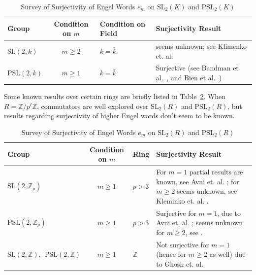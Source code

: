 \documentclass[10pt,twoside]{amsart}
\newcommand{\SL}{\mathrm{SL}}
\theoremstyle{definition}
\theoremstyle{definition}
\begin{document}
\begin{table}[htbp]\caption{Survey of Surjectivity of Engel Words \( e_m \) on $\SL_2(K)$ and $\mathrm{PSL_2}(K)$}
\centering
\label{tab:engel_survey2}
\small 
\begin{tabular}{@{} l c p{3cm} p{7cm} @{}}
\toprule
\textbf{Group} & \textbf{Condition on \( m \)} & \textbf{Condition on Field} & \textbf{Surjectivity Result} \\
\midrule
\addlinespace
\( \text{SL}(2, k) \) & \( m \geq 2 \) & \(k=\bar k \) & seems unknown; see Klimenko et. al. \cite{kunvkacmoddy} \\
\addlinespace
\( \text{PSL}(2, k) \) &  \( m \geq 1 \) & \( k=\bar k \) & Surjective (see Bandman et al.~\cite{BaZa2016}, and Bien et al.~\cite{BNT2024}) \\
 

\bottomrule
\end{tabular}
\end{table}

Some known results over certain rings are briefly listed in Table~\ref{tab:engel_survey3}. When $R = \mathbb{Z}/p^{\ell}\mathbb{Z}$, commutators are well explored over $\SL_2(R)$ and $\mathrm{PSL}_2(R)$, but results regarding surjectivity of higher Engel words don't seem to be known.   

\begin{table}[htbp]\caption{Survey of Surjectivity of Engel Words \( e_m \) on $\SL_2(R)$ and $\mathrm{PSL_2}(R)$}
\centering
\label{tab:engel_survey3}
\small 
\begin{tabular}{@{} l c p{2cm} p{7cm} @{}}
\toprule
\textbf{Group} & \textbf{Condition on \( m \)} & \textbf{Ring} & \textbf{Surjectivity Result} \\
\midrule
\( \text{SL}(2, \mathbb{Z}_p) \) & \( m \geq 1 \) & \(p>3\) & For $m=1$ partial results are known, see Avni et. al.  \cite{AvniGelanderKassabovShalev}; for $m\geq 2$ seems unknown, see Kleminko et. al. \cite{kunvkacmoddy}. \\
\addlinespace
\( \text{PSL}(2, \mathbb{Z}_p) \) & \( m \geq 1 \) & \(p>3 \) & Surjective for $m=1$, due to Avni et. al.  \cite{AvniGelanderKassabovShalev}; seems unknown for $m\geq 2$, see \cite{kunvkacmoddy}. \\
\addlinespace
\( \text{SL}(2, \mathbb{Z}), \ \ \text{PSL}(2, \mathbb{Z}) \) & \( m \geq 1 \) & \(\mathbb{Z}\) & Not surjective for $m=1$ (hence for $m\geq 2$ as well) due to Ghosh et. al.~\cite{SL2ChenMeiri} \\
\bottomrule
\end{tabular}
\end{table}
\end{document}

